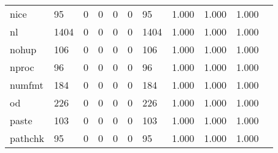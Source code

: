 \begin{longtable}{lp{1.10cm}p{1.10cm}p{1.10cm}p{1.10cm}p{1.10cm}p{1.10cm}p{1.10cm}p{1.10cm}p{1.10cm}p{1.10cm}}
nice      &                     95 &                                  0 &                                 0 &                                0 &                                 0 &                              95 &                          1.000 &                                 1.000 &                               1.000 \\
nl        &                   1404 &                                  0 &                                 0 &                                0 &                                 0 &                            1404 &                          1.000 &                                 1.000 &                               1.000 \\
nohup     &                    106 &                                  0 &                                 0 &                                0 &                                 0 &                             106 &                          1.000 &                                 1.000 &                               1.000 \\
nproc     &                     96 &                                  0 &                                 0 &                                0 &                                 0 &                              96 &                          1.000 &                                 1.000 &                               1.000 \\
numfmt    &                    184 &                                  0 &                                 0 &                                0 &                                 0 &                             184 &                          1.000 &                                 1.000 &                               1.000 \\
od        &                    226 &                                  0 &                                 0 &                                0 &                                 0 &                             226 &                          1.000 &                                 1.000 &                               1.000 \\
paste     &                    103 &                                  0 &                                 0 &                                0 &                                 0 &                             103 &                          1.000 &                                 1.000 &                               1.000 \\
pathchk   &                     95 &                                  0 &                                 0 &                                0 &                                 0 &                              95 &                          1.000 &                                 1.000 &                               1.000 \\

\end{longtable}
